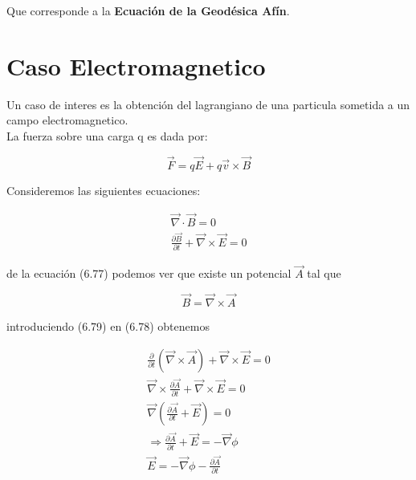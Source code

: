 \documentclass[12pt]{report}
\begin{document}
Que corresponde a la \textbf{ Ecuaci\'on de la Geod\'esica Af\'in}.







































\section{Caso Electromagnetico}  
 


Un caso de interes es la obtención del lagrangiano de una particula sometida a un campo electromagnetico. \\

La fuerza sobre una carga q es dada por:

\begin{equation}
\vec{F} = q\vec{E} + q\vec{v} \times \vec{B}
\end{equation}

Consideremos las siguientes ecuaciones:

\begin{eqnarray}
\vec{\nabla} \cdot \vec{B} = 0 \\
\frac{\partial \vec{B}}{\partial t} + \vec{\nabla} \times \vec{E} = 0
\end{eqnarray}


de la ecuación (6.77) podemos ver que existe un potencial $\vec{A}$ tal que 

\begin{equation}
\vec{B} = \vec{\nabla} \times \vec{A}
\end{equation}
 
 introduciendo (6.79) en (6.78) obtenemos
 
\begin{eqnarray}
\frac{\partial }{\partial t} \left( \vec{\nabla} \times \vec{A} \right) + \vec{\nabla} \times \vec{E} =0 \\
\vec{\nabla} \times \frac{\partial \vec{A}}{\partial t} + \vec{\nabla} \times \vec{E} =0 \\
\vec{\nabla} \left( \frac{\partial \vec{A}}{\partial t} + \vec{E} \right) = 0 \\
\Rightarrow \frac{\partial \vec{A}}{\partial t} + \vec{E} = - \vec{\nabla} \phi \\
\vec{E} = -\vec{\nabla}\phi - \frac{\partial \vec{A}}{\partial t}
\end{eqnarray}
\end{document}
